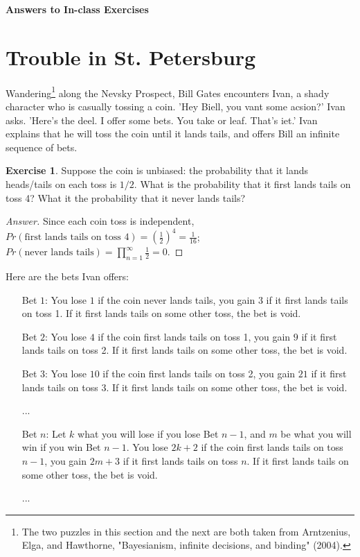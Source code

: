 \documentclass[11pt]{article}
\theoremstyle{definition}
\newtheorem{exer}{Exercise}
\begin{document}




\begin{center}
{\LARGE \bf Answers to In-class Exercises}
\end{center}

\smallskip

\section{Trouble in St. Petersburg}

Wandering\footnote{The two puzzles in this section and the next are both taken from Arntzenius, Elga, and Hawthorne, "Bayesianism, infinite decisions, and binding" (2004).} along the Nevsky Prospect, Bill Gates encounters Ivan, a shady character who is casually tossing a coin. 'Hey Biell, you vant some acsion?' Ivan asks. 'Here's the deel. I offer some bets. You take or leaf. That's iet.' Ivan explains that he will toss the coin until it lands tails, and offers Bill an infinite sequence of bets.

\begin{exer}
Suppose the coin is unbiased: the probability that it lands heads/tails on each toss is $1/2$. What is the probability that it first lands tails on toss 4? What it the probability that it never lands tails?
\end{exer}

\begin{proof}[Answer]
Since each coin toss is independent, $Pr(\text{first lands tails on toss 4}) = (\frac{1}{2})^4 = \frac{1}{16}$; $Pr(\text{never lands tails}) = \prod_{n=1}^{\infty}\frac{1}{2} = 0$.

\end{proof}


Here are the bets Ivan offers:
\begin{enumerate}[leftmargin=2 \parindent]
\item[Bet $1$:] You lose $1$ if the coin never lands tails, you gain $3$ if it first lands tails on toss 1. If it first lands tails on some other toss, the bet is void.
\item[Bet $2$:] You lose $4$ if the coin first lands tails on toss 1, you gain $9$ if it first lands tails on toss 2. If it first lands tails on some other toss, the bet is void.
\item[Bet $3$:] You lose $10$ if the coin first lands tails on toss 2, you gain $21$ if it first lands tails on toss 3. If it first lands tails on some other toss, the bet is void.
\item[...]
\item[Bet $n$:] Let $k$ what you will lose if you lose Bet $n-1$, and $m$ be what you will win if you win Bet $n-1$. You lose $2k+2$ if the coin first lands tails on toss $n-1$, you gain $2m+3$ if it first lands tails on toss $n$. If it first lands tails on some other toss, the bet is void.
\item[...]
\end{enumerate}
\end{document}
